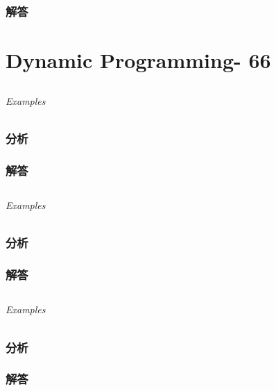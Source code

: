 \documentclass[UTF8,a4paper,12pt]{ctexbook}
\begin{document}
	\subsection{解答}
\chapter{Dynamic Programming- 66}
\section{}
	
	\subparagraph{Examples}
	
	\subsection{分析}
	
	\subsection{解答}
	
\section{}
	
	\subparagraph{Examples}
	
	\subsection{分析}
	
	\subsection{解答}
	
\section{}
	
	\subparagraph{Examples}
	
	\subsection{分析}
	
	\subsection{解答}
	
\section{}
	
\end{document}
